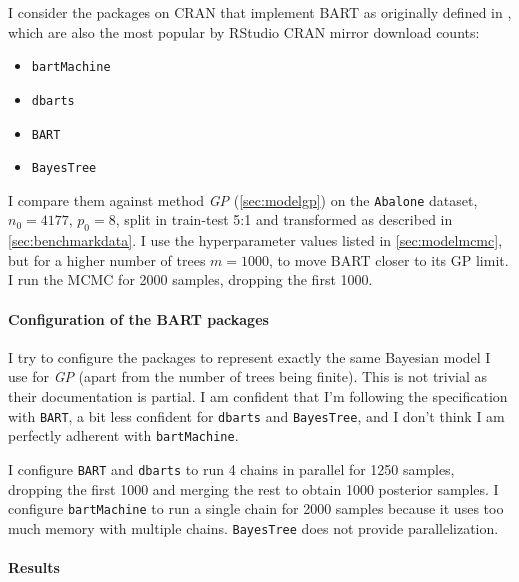 \documentclass[a4paper]{article}
\theoremstyle{definition}
\begin{document}
    I consider the packages on CRAN that implement BART as originally defined in \textcite{chipman2010}, which are also the most popular by RStudio CRAN mirror download counts:
    \begin{itemize}
        \item \texttt{bartMachine} \autocite{kapelner2016,kapelner2023}
        \item \texttt{dbarts} \autocite{dorie2024}
        \item \texttt{BART} \autocite{sparapani2021,mcculloch2024}
        \item \texttt{BayesTree} \autocite{chipman2010,chipman2024}
    \end{itemize}
    I compare them against method \emph{GP} (\autoref{sec:modelgp}) on the \texttt{Abalone} dataset, $n_0=4177$, $p_0=8$, split in train-test 5:1 and transformed as described in \autoref{sec:benchmarkdata}. I use the hyperparameter values listed in \autoref{sec:modelmcmc}, but for a higher number of trees $m=1000$, to move BART closer to its GP limit. I run the MCMC for 2000 samples, dropping the first 1000.

    \paragraph{Configuration of the BART packages}

    I try to configure the packages to represent exactly the same Bayesian model I use for \emph{GP} (apart from the number of trees being finite). This is not trivial as their documentation is partial. I am confident that I'm following  the specification with \texttt{BART}, a bit less confident for \texttt{dbarts} and \texttt{BayesTree}, and I don't think I am perfectly adherent with \texttt{bartMachine}.

    I configure \texttt{BART} and \texttt{dbarts} to run 4 chains in parallel for 1250 samples, dropping the first 1000 and merging the rest to obtain 1000 posterior samples. I configure \texttt{bartMachine} to run a single chain for 2000 samples because it uses too much memory with multiple chains. \texttt{BayesTree} does not provide parallelization.

    \paragraph{Results}
\end{document}
